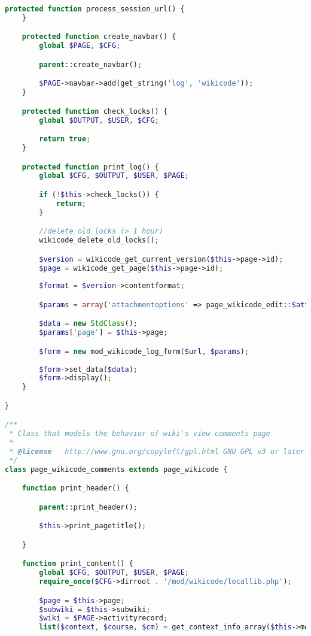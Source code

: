 \begin{lstlisting}[language=PHP]
    protected function process_session_url() {
    }

    protected function create_navbar() {
        global $PAGE, $CFG;

        parent::create_navbar();

        $PAGE->navbar->add(get_string('log', 'wikicode'));
    }

    protected function check_locks() {
        global $OUTPUT, $USER, $CFG;

        return true;
    }

    protected function print_log() {
        global $CFG, $OUTPUT, $USER, $PAGE;

        if (!$this->check_locks()) {
            return;
        }

        //delete old locks (> 1 hour)
        wikicode_delete_old_locks();

        $version = wikicode_get_current_version($this->page->id);
		$page = wikicode_get_page($this->page->id);
		
        $format = $version->contentformat;

        $params = array('attachmentoptions' => page_wikicode_edit::$attachmentoptions, 'format' => $version->contentformat, 'version' => $versionnumber, 'pagetitle'=>$this->page->title);

        $data = new StdClass();
		$params['page'] = $this->page;

        $form = new mod_wikicode_log_form($url, $params);
		
        $form->set_data($data);
        $form->display();
    }

}

/**
 * Class that models the behavior of wiki's view comments page
 *
 * @license   http://www.gnu.org/copyleft/gpl.html GNU GPL v3 or later
 */
class page_wikicode_comments extends page_wikicode {

    function print_header() {

        parent::print_header();

        $this->print_pagetitle();

    }

    function print_content() {
        global $CFG, $OUTPUT, $USER, $PAGE;
        require_once($CFG->dirroot . '/mod/wikicode/locallib.php');

        $page = $this->page;
        $subwiki = $this->subwiki;
        $wiki = $PAGE->activityrecord;
        list($context, $course, $cm) = get_context_info_array($this->modcontext->id);


\end{lstlisting}
